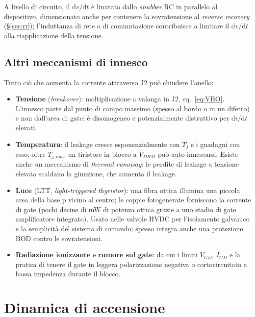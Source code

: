 \documentclass[11pt,a4paper]{article}
\newcommand{\VDRM}{\ensuremath{V_{DRM}}}
\newcommand{\dvdt}{\ensuremath{\mathrm{d}v/\mathrm{d}t}}
\newcommand{\didt}{\ensuremath{\mathrm{d}i/\mathrm{d}t}}
\newcommand{\en}[1]{\emph{#1}}   %
\begin{document}
A livello di circuito, il $\dvdt$ è limitato dallo \en{snubber} RC in parallelo al dispositivo, dimensionato anche per contenere la sovratensione al \en{reverse recovery} (\S\ref{sec:rr}); l'induttanza di rete o di commutazione contribuisce a limitare il $\dvdt$ alla riapplicazione della tensione.

\subsection{Altri meccanismi di innesco}
\label{sec:altri}
Tutto ciò che aumenta la corrente attraverso J2 può chiudere l'anello:
\begin{itemize}
  \item \textbf{Tensione} (\en{breakover}): moltiplicazione a valanga in J2, eq.~\eqref{eq:VBO}. L'innesco parte dal punto di campo massimo (spesso al bordo o in un difetto) e non dall'area di gate: è disomogeneo e potenzialmente distruttivo per $\didt$ elevati.
  \item \textbf{Temperatura}: il leakage cresce esponenzialmente con $T_j$ e i guadagni con esso; oltre $T_{j,max}$ un tiristore in blocco a $\VDRM$ può auto-innescarsi. Esiste anche un meccanismo di \en{thermal runaway}: le perdite di leakage a tensione elevata scaldano la giunzione, che aumenta il leakage.
  \item \textbf{Luce} (LTT, \en{light-triggered thyristor}): una fibra ottica illumina una piccola area della base p vicino al centro; le coppie fotogenerate forniscono la corrente di gate (pochi decine di \unit{\mW} di potenza ottica grazie a uno stadio di gate amplificatore integrato). Usato nelle valvole HVDC per l'isolamento galvanico e la semplicità del sistema di comando; spesso integra anche una protezione BOD contro le sovratensioni.
  \item \textbf{Radiazione ionizzante} e \textbf{rumore sul gate}: da cui i limiti $V_{GD}$, $I_{GD}$ e la pratica di tenere il gate in leggera polarizzazione negativa o cortocircuitato a bassa impedenza durante il blocco.
\end{itemize}

\section{Dinamica di accensione}
\end{document}
